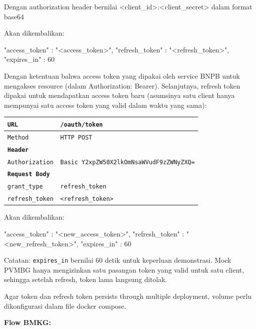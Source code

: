 Dengan authorization header bernilai \textless client\_id\textgreater:\textless client\_secret\textgreater{} dalam format base64

Akan dikembalikan:

\begin{codebox}
{
    "access_token" : "<access_token>",
    "refresh_token" : "<refresh_token>",
    "expires_in" : 60
}
\end{codebox}

Dengan ketentuan bahwa access token yang dipakai oleh service BNPB untuk mengakses resource (dalam Authorization: Bearer). Selanjutnya, refresh token dipakai untuk mendapatkan access token baru (asumsinya satu client hanya mempunyai satu access token yang valid dalam waktu yang sama):

\begin{longtable}[]{|>{\raggedright\arraybackslash}p{\dimexpr(\linewidth-4\tabcolsep)/2\relax}|>{\raggedright\arraybackslash}p{\dimexpr(\linewidth-4\tabcolsep)/2\relax}|}
\hline
\texttt{URL} & \texttt{/oauth/token} \\
\hline
\endhead
\endlastfoot
\texttt{Method} & \texttt{HTTP\ POST} \\
\hline
\textbf{\texttt{Header}} & \\
\hline
\texttt{Authorization} & \texttt{Basic\ Y2xpZW50X2lkOmNsaWVudF9zZWNyZXQ=} \\
\hline
\textbf{\texttt{Request\ Body}} & \\
\hline
\texttt{grant\_type} & \texttt{refresh\_token} \\
\hline
\texttt{refresh\_token} & \texttt{\textless{}refresh\_token\textgreater{}} \\
\hline
\end{longtable}

Akan dikembalikan:

\begin{codebox}
{
    "access_token" : "<new_access_token>",
    "refresh_token" : "<new_refresh_token>",
    "expires_in" : 60
}
\end{codebox}

Catatan: \texttt{expires\_in} bernilai 60 detik untuk keperluan demonstrasi. Mock PVMBG hanya mengizinkan satu pasangan token yang valid untuk satu client, sehingga setelah refresh, token lama langsung ditolak.

Agar token dan refresh token persists through multiple deployment, volume perlu dikonfigurasi dalam file docker compose.

\textbf{Flow BMKG:}

